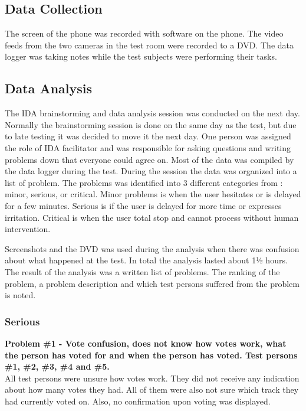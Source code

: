 \subsection{Data Collection}
The screen of the phone was recorded with software on the phone. The
video feeds from the two cameras in the test room were recorded to a
DVD. The data logger was taking notes while the test subjects were
performing their tasks.

\subsection{Data Analysis}
The IDA brainstorming and data analysis session was conducted on the next day. Normally the brainstorming session is done on the same day as the test, but due to late testing it was decided to move it the next day. One person was assigned the role of IDA facilitator and was responsible for asking questions and writing problems down that everyone could agree on. Most of the data was compiled by the data logger during the test. During the session the data was organized into a list of problem. The problems was identified into 3 different categories from \cite{molich2007usable}: minor, serious, or critical. Minor problems is when the user hesitates or is delayed for a few minutes. Serious is if the user is delayed for more time or expresses irritation. Critical is when the user total stop and cannot process without human intervention.

Screenshots and the DVD was used during the analysis when there was
confusion about what happened at the test. In total the analysis
lasted about 1½ hours. The result of the analysis was a written list of problems. The ranking of the problem, a problem description and which test persons suffered from the problem is noted.

\subsubsection{Serious}
\textbf{Problem \#1 - Vote confusion, does not know how votes work, what the person has
    voted for and when the person has voted. Test persons \#1, \#2,
    \#3, \#4 and \#5.}\\
  All test persons were unsure how votes work. They did not receive
  any indication about how many votes they had. All of them were also
  not sure which track they had currently voted on. Also, no
  confirmation upon voting was displayed.\\

